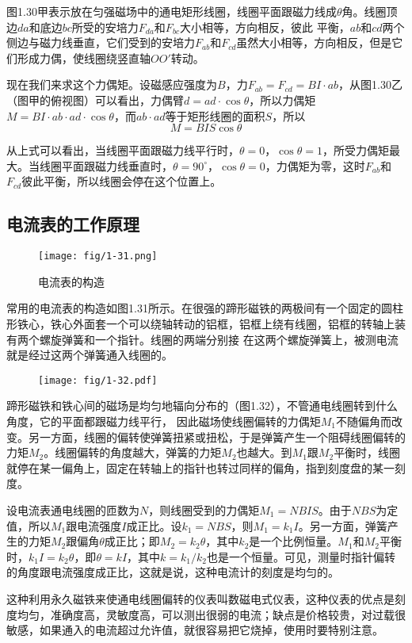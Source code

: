 图1.30甲表示放在匀强磁场中的通电矩形线圈，线圈平面跟磁力线成$\theta$角。线圈顶边$da$和底边$bc$所受的安培力$F_{da}$和$F_{bc}$大小相等，方向相反，彼此
平衡，$ab$和$cd$两个侧边与磁力线垂直，它们受到的安培力$F_{ab}$和$F_{cd}$虽然大小相等，方向相反，但是它们形成力偶，使线圈绕竖直轴$OO'$转动。

现在我们来求这个力偶矩。设磁感应强度为$B$，力$F_{ab}=
F_{cd}=BI·ab$，从图1.30乙（图甲的俯视图）可以看出，力偶臂$d=ad\cdot \cos\theta$，所以力偶矩$M=BI\cdot ab\cdot ad\cdot \cos\theta$，而$ab\cdot ad$等于矩形线圈的面积$S$，所以$$M=BIS\cos\theta$$

从上式可以看出，当线圈平面跟磁力线平行时，$\theta=0$，$\cos\theta=1$，所受力偶矩最大。当线圈平面跟磁力线垂直时，$\theta=90^{\circ}$，$\cos\theta=0$，力偶矩为零，这时$F_{ab}$和$F_{cd}$彼此平衡，所以线圈会停在这个位置上。

\subsection{电流表的工作原理}
    \begin{figure}[htp]\centering
	\texttt{[image: fig/1-31.png]}
	\caption{电流表的构造}
\end{figure}
常用的电流表的构造如图1.31所示。在很强的蹄形磁铁的两极间有一个固定的圆柱形铁心，铁心外面套一个可以绕轴转动的铝框，铝框上绕有线圈，铝框的转轴上装有两个螺旋弹簧和一个指针。线圈的两端分别接
在这两个螺旋弹簧上，被测电流就是经过这两个弹簧通入线圈的。
\begin{figure}[htp]\centering
\texttt{[image: fig/1-32.pdf]}
\caption{}
\end{figure}

蹄形磁铁和铁心间的磁场是均匀地辐向分布的（图1.32），不管通电线圈转到什么角度，它的平面都跟磁力线平行，
因此磁场使线圈偏转的力偶矩$M_1$不随偏角而改变。另一方面，线圈的偏转使弹簧扭紧或扭松，于是弹簧产生一个阻碍线圈偏转的力矩$M_2$。线圈偏转的角度越大，弹簧的力矩$M_2$也越大。到$M_1$跟$M_2$平衡时，线圈就停在某一偏角上，固定在转轴上的指针也转过同样的偏角，指到刻度盘的某一刻度。

设电流表通电线圈的匝数为$N$，则线圈受到的力偶矩$M_1=NBIS$。由于$NBS$为定值，所以$M_1$跟电流强度$I$成正比。设$k_1=NBS$，则$M_1=k_1I$。另一方面，弹簧产生的力矩$M_2$跟偏角$\theta$成正比；即$M_2=k_2\theta$，其中$k_2$是一个比例恒量。$M_1$和$M_2$平衡时，$k_1I=k_2\theta$，即$\theta =kI$，其中$k=k_1/k_2$也是一个恒量。可见，测量时指针偏转的角度跟电流强度成正比，这就是说，这种电流计的刻度是均匀的。

这种利用永久磁铁来使通电线圈偏转的仪表叫数磁电式仪表，这种仪表的优点是刻度均匀，准确度高，灵敏度高，可以测出很弱的电流；缺点是价格较贵，对过载很敏感，如果通入的电流超过允许值，就很容易把它烧掉，使用时要特别注意。

